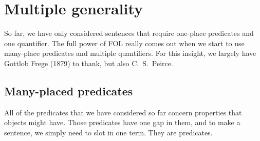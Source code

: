 

\chapter{Multiple generality}\label{s:MultipleGenerality}
So far, we have only considered sentences that require one-place predicates and one quantifier. The full power of FOL really comes out when we start to use many-place predicates and multiple quantifiers. For this insight, we largely have Gottlob Frege (1879) to thank, but also C.~S.~Peirce.


\section{Many-placed predicates}
All of the predicates that we have considered so far concern properties that objects might have. Those predicates have one gap in them, and to make a sentence, we simply need to slot in one term. They are  predicates.

